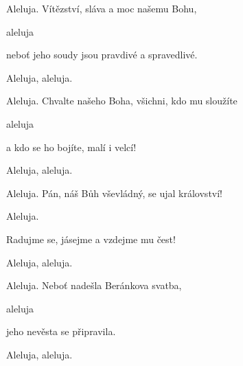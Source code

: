 
Aleluja.
Vítězství, sláva a moc našemu Bohu, 

 aleluja

neboť jeho soudy jsou pravdivé a spravedlivé. 

 Aleluja, aleluja.

Aleluja. 
Chvalte našeho Boha, všichni, kdo mu sloužíte 

 aleluja

a kdo se ho bojíte, malí i velcí! 

 Aleluja, aleluja.

Aleluja. 
Pán, náš Bůh vševládný, se ujal království! 

 Aleluja.

Radujme se, jásejme a vzdejme mu čest! 

 Aleluja, aleluja.

Aleluja. 
Neboť nadešla Beránkova svatba, 

 aleluja

jeho nevěsta se připravila. 

 Aleluja, aleluja. 
